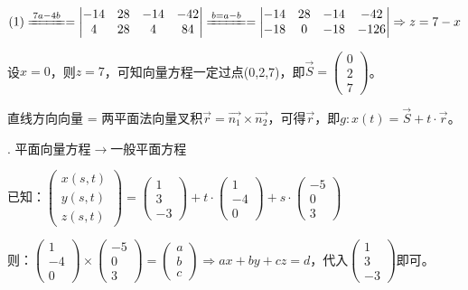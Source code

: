 \documentclass[fleqn]{article}
\begin{document}
$(1)\xlongequal[]{7a-4b}=\begin{vmatrix}
    -14&28&-14&-42\\4&28&4&84
\end{vmatrix}\xlongequal[]{b=a-b}=\begin{vmatrix}
    -14&28&-14&-42\\-18&0&-18&-126
\end{vmatrix}\Rightarrow z=7-x$

设$x=0$，则$z=7$，可知向量方程一定过点(0,2,7)，即$\vec{S}=\begin{pmatrix}
    0\\2\\7
\end{pmatrix}$。

直线方向向量 = 两平面法向量叉积$\vec{r}=\vec{n_1}\times\vec{n_2}$，可得$\vec{r}$，即$g: x(t)=\vec{S}+t\cdot\vec{r}$。

. 平面向量方程$\rightarrow$一般平面方程

已知：$\begin{pmatrix}
    x(s,t)\\y(s,t)\\z(s,t)
\end{pmatrix}=\begin{pmatrix}
    1\\3\\-3
\end{pmatrix}+t\cdot\begin{pmatrix}
    1\\-4\\0
\end{pmatrix}+s\cdot\begin{pmatrix}
    -5\\0\\3
\end{pmatrix}$

则：$\begin{pmatrix}
    1\\-4\\0
\end{pmatrix}\times\begin{pmatrix}
    -5\\0\\3
\end{pmatrix}=\begin{pmatrix}
    a\\b\\c
\end{pmatrix}\Rightarrow ax+by+cz=d$，代入$\begin{pmatrix}
    1\\3\\-3
\end{pmatrix}$即可。
\end{document}
